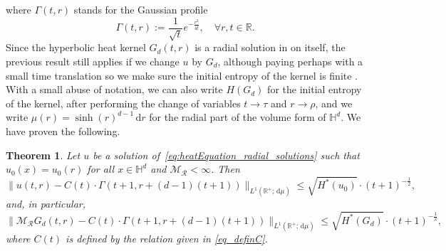 \documentclass[12pt,longbibliography]{article}
\def\R{\mathbb{R}}
\def\d{\,\mathrm{d}}
\def\R{\mathbb{R}}
\def\d{\,\mathrm{d}}
\def\H{\mathbb{H}}
\newtheorem{thm}{Theorem}[section]
\theoremstyle{definition}
\theoremstyle{remark}
\theoremstyle{example}
\begin{document}
where $\Gamma(t,r)$ stands for the Gaussian profile
\begin{equation}\label{eq:GaussianProfile}
	\Gamma(t,r):=\frac{1}{\sqrt{t}}e^{-\frac{r^2}{4t}}, \quad \forall r,t \in \mathbb{R}.
\end{equation}
Since the hyperbolic heat kernel $G_d(t,r)$ is a radial solution in on itself, the previous result still applies if we change $u$ by $G_d$, although paying perhaps with a small time translation so we make sure the initial entropy of the kernel is finite . With a small abuse of notation, we can also write $H(G_d)$ for the initial entropy of the kernel, after performing the change of variables $t\to \tau$ and $r\to \rho$, and we write $\mu (r) = \sinh (r)^{d-1} \d r$ for the radial part of the volume form of $\mathbb{H}^d$. We have proven the following.

\begin{thm}\label{thm:L^1_radially_symmetric_asymptotic}
	Let $u$ be a solution of~\eqref{eq:heatEquation_radial_solutions} such that $u_0(x)=u_0(r)$ for all $x\in\H^d$ and $\mathcal{M}_{\mathcal{R}}<\infty$. Then
	\[
	\| u(t,r) - C(t)\cdot\Gamma(t+1, r+(d-1)(t+1)) \|_{L^1(\R^+; \d\mu)}  \leq \sqrt{H^*(u_0)}\cdot (t+1)^{-\frac{1}{2}},
	\]
	and, in particular,
	\[
	\|\mathcal{M}_{\mathcal{R}} G_d(t,r) - C(t)\cdot\Gamma(t+1, r+(d-1)(t+1))  \|_{L^1(\R^+; \d\mu)}\leq\sqrt{H^*(G_d)} \cdot (t+1)^{-\frac{1}{2}},
	\]
	where $C(t)$ is defined by the relation given in \eqref{eq_definC}.
\end{thm}
\end{document}
